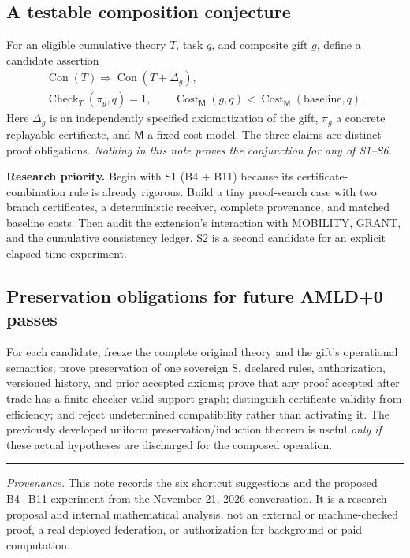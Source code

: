 \documentclass[11pt,letterpaper]{article}
\theoremstyle{definition}\newtheorem{definition}[theorem]{Definition}\newtheorem{example}[theorem]{Example}
\theoremstyle{remark}\newtheorem{remark}[theorem]{Remark}
\newcommand{\Con}{\operatorname{Con}}
\providecommand{\Cost}{\operatorname{Cost}}
\providecommand{\Vfy}{\operatorname{Check}}
\begin{document}
\subsection*{A testable composition conjecture}
For an eligible cumulative theory \(T\), task \(q\), and composite gift \(g\), define a candidate assertion
\[
\begin{gathered}
\Con(T)\Longrightarrow\Con(T+\Delta_g),\\[3pt]
\Vfy_T(\pi_g,q)=1,\qquad
\Cost_{\mathsf M}(g,q)<\Cost_{\mathsf M}(\mathrm{baseline},q).
\end{gathered}
\]
Here \(\Delta_g\) is an independently specified axiomatization of the gift, \(\pi_g\) a concrete replayable certificate, and \(\mathsf M\) a fixed cost model. The three claims are distinct proof obligations. \emph{Nothing in this note proves the conjunction for any of S1--S6.}

\textbf{Research priority.} Begin with S1 (B4 + B11) because its certificate-combination rule is already rigorous. Build a tiny proof-search case with two branch certificates, a deterministic receiver, complete provenance, and matched baseline costs. Then audit the extension's interaction with MOBILITY, GRANT, and the cumulative consistency ledger. S2 is a second candidate for an explicit elapsed-time experiment.

\subsection*{Preservation obligations for future AMLD+0 passes}
For each candidate, freeze the complete original theory and the gift's operational semantics; prove preservation of one sovereign S, declared rules, authorization, versioned history, and prior accepted axioms; prove that any proof accepted after trade has a finite checker-valid support graph; distinguish certificate validity from efficiency; and reject undetermined compatibility rather than activating it. The previously developed uniform preservation/induction theorem is useful \emph{only if} these actual hypotheses are discharged for the composed operation.

\smallskip\hrule\smallskip
\textit{Provenance.} This note records the six shortcut suggestions and the proposed B4+B11 experiment from the November 21, 2026 conversation. It is a research proposal and internal mathematical analysis, not an external or machine-checked proof, a real deployed federation, or authorization for background or paid computation.
\end{document}
